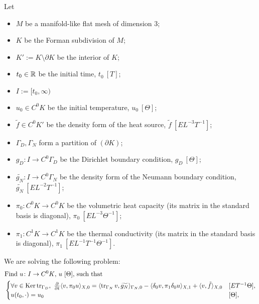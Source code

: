 \begin{formulation}
  Let
  \begin{itemize}
    \item
      $M$ be a manifold-like flat mesh of dimension $3$;
    \item
      $K$ be the Forman subdivision of $M$;
    \item
      $K' := K \setminus \partial K$ be the interior of $K$;
    \item
      $t_0 \in \mathbb{R}$ be the initial time, $t_0\ [T]$;
    \item
      $I := [t_0, \infty)$
    \item
      $u_0 \in C^0 K$ be the initial temperature, $u_0\ [\Theta]$;
    \item
      $\tilde{f} \in C^0 K'$ be the density form of the heat source,
      $\tilde{f}\ [E L^{-3} T^{-1}]$;
    \item
      $\Gamma_D, \Gamma_N$ form a partition of $(\partial K)$;
    \item
      $g_D \colon I \to C^0 \Gamma_D$
      be the Dirichlet boundary condition, $g_D\ [\Theta]$;
    \item
      $\widetilde{g_N} \colon I \to C^0 \Gamma_N$
      be the density form of the Neumann boundary condition,
      $\widetilde{g_N}\ [E L^{-2} T^{-1}]$;
    \item
      $\pi_0 \colon C^0 K \to C^0 K$ be the volumetric heat capacity
      (its matrix in the standard basis is diagonal),
      $\pi_0\ [E L^{-3} \Theta^{-1}]$;
    \item
      $\pi_1 \colon C^1 K \to C^1 K$ be the thermal conductivity
      (its matrix in the standard basis is diagonal),
      $\pi_1\ [E L^{-1} T^{-1} \Theta^{-1}]$.
  \end{itemize}
  We are solving the following problem:
  \begin{equation}
    \begin{split}
      & \text{Find $u \colon I \to C^0 K$, $u\ [\Theta]$, such that} \\
      &
      \begin{cases}
        \forall v \in \mathop{\rm Ker}\nolimits \mathop{\rm tr}\nolimits_{\Gamma_D},\
          \frac{\partial}{\partial t} \langle v,\pi_0 u\rangle_{X, 0} =
            \langle\mathop{\rm tr}\nolimits_{\Gamma_N} v,\widetilde{g_N}\rangle_{\Gamma_N, 0}
          - \langle\delta_0 v,\pi_1 \delta_0 u\rangle_{X, 1}
          + \langle v,\tilde{f}\rangle_{X, 0}
        & [E T^{-1} \Theta], \\
        u(t_0, \cdot) = u_0 & [\Theta], \\

\end{cases}
\end{split}
\end{equation}
\end{formulation}
